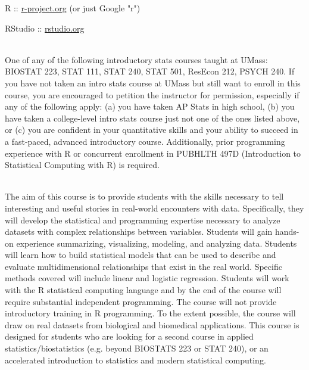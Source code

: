 \documentclass[10pt]{article}
\begin{document}


R :: \href{http://www.r-project.org}{r-project.org} (or just Google "r")

RStudio :: \href{http://www.rstudio.org}{rstudio.org}


\bigskip
{}\\
One of any of the following introductory stats courses taught at UMass: BIOSTAT 223, STAT 111, STAT 240, STAT 501, ResEcon 212, PSYCH 240. If you have not taken an intro stats course at UMass but still want to enroll in this course, you are encouraged to petition the instructor for permission, especially if any of the following apply: (a) you have taken AP Stats in high school, (b) you have taken a college-level intro stats course just not one of the ones listed above, or (c) you are confident in your quantitative skills and your ability to succeed in a fast-paced, advanced introductory course. Additionally, prior programming experience with R or concurrent enrollment in PUBHLTH 497D (Introduction to Statistical Computing with R) is required.


\bigskip
{}\\ 
The aim of this course is to provide students with the skills necessary to tell interesting and useful stories in real-world encounters with data. Specifically, they will develop the statistical and programming expertise necessary to analyze datasets with complex relationships between variables. Students will gain hands-on experience summarizing, visualizing, modeling, and analyzing data. Students will learn how to build statistical models that can be used to describe and evaluate multidimensional relationships that exist in the real world. Specific methods covered will include linear and logistic regression. Students will work with the R statistical computing language and by the end of the course will require substantial independent programming. The course will not provide introductory training in R programming. To the extent possible, the course will draw on real datasets from biological and biomedical applications. This course is designed for students who are looking for a second course in applied statistics/biostatistics (e.g. beyond BIOSTATS 223 or STAT 240), or an accelerated introduction to statistics and modern statistical computing.
\end{document}
